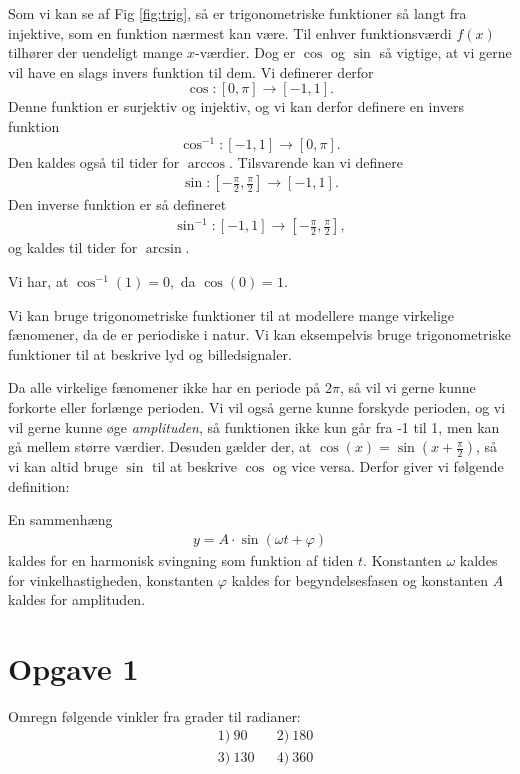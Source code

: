 Som vi kan se af Fig \ref{fig:trig}, så er trigonometriske funktioner så langt fra injektive, som en funktion nærmest kan være. Til enhver funktionsværdi $f(x)$ tilhører der uendeligt mange $x$-værdier. Dog er $\cos$ og $\sin$ så vigtige, at vi gerne vil have en slags invers funktion til dem. Vi definerer derfor $$\cos : [0, \pi] \to [-1,1].$$ Denne funktion er surjektiv og injektiv, og vi kan derfor definere en invers funktion 
$$\cos^{-1} : [-1,1] \to [0,\pi].$$ 
Den kaldes også til tider for $\arccos$. Tilsvarende kan vi definere 
\begin{align*}
	\sin : [-\frac{\pi}{2},\frac{\pi}{2}] \to [-1,1].
\end{align*}
Den inverse funktion er så defineret
\begin{align*}
	\sin^{-1} : [-1,1] \to [-\frac{\pi}{2}, \frac{\pi}{2}],
\end{align*}
og kaldes til tider for $\arcsin$. 

\begin{exa}
	Vi har, at $\cos^{-1}(1) = 0,$ da $\cos(0) = 1$.
\end{exa}
Vi kan bruge trigonometriske funktioner til at modellere mange virkelige fænomener, da de er periodiske i natur. Vi kan eksempelvis bruge trigonometriske funktioner til at beskrive lyd og billedsignaler.

Da alle virkelige fænomener ikke har en periode på $2\pi$, så vil vi gerne kunne forkorte eller forlænge perioden. Vi vil også gerne kunne forskyde perioden, og vi vil gerne kunne øge \textit{amplituden}, så funktionen ikke kun går fra -1 til 1, men kan gå mellem større værdier. Desuden gælder der, at $\cos(x) = \sin(x + \frac{\pi}{2})$, så vi kan altid bruge $\sin$ til at beskrive $\cos$ og vice versa. Derfor giver vi følgende definition:
\begin{defn}
En sammenhæng 
\begin{align*}
y = A\cdot \sin(\omega t + \varphi)
\end{align*}
kaldes for en harmonisk svingning som funktion af tiden $t$. Konstanten $\omega$ kaldes for vinkelhastigheden, konstanten $\varphi$ kaldes for begyndelsesfasen og konstanten $A$ kaldes for amplituden. 
\end{defn}

\section*{Opgave 1}
Omregn følgende vinkler fra grader til radianer:
\begin{align*}
&1) \  90   &&2) \  180 \\
&3) \  130   &&4) \ 360  
\end{align*} 

